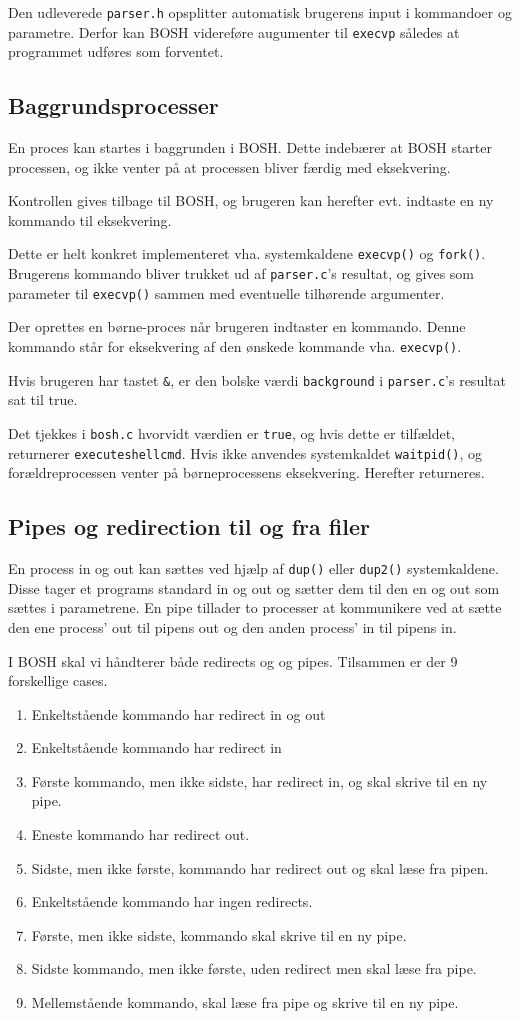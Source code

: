 Den udleverede \verb+parser.h+ opsplitter automatisk brugerens input i kommandoer og parametre. Derfor kan BOSH videreføre augumenter til \verb+execvp+ således at programmet udføres som forventet.
\subsection{Baggrundsprocesser}
En proces kan startes i baggrunden i BOSH. Dette indebærer at BOSH starter processen, og ikke venter på at processen bliver færdig med eksekvering. 

Kontrollen gives tilbage til BOSH, og brugeren kan herefter evt. indtaste en ny kommando til eksekvering. 

Dette er helt konkret implementeret vha. systemkaldene \verb+execvp()+ og \verb+fork()+. Brugerens kommando bliver trukket ud af \verb+parser.c+'s resultat, og gives som parameter til \verb+execvp()+ sammen med eventuelle tilhørende argumenter. 

Der oprettes en børne-proces når brugeren indtaster en kommando. Denne kommando står for eksekvering af den ønskede kommande vha. \verb+execvp()+. 

Hvis brugeren har tastet \verb+&+, er den bolske værdi \verb+background+ i \verb+parser.c+'s resultat sat til true. 

Det tjekkes i \verb+bosh.c+ hvorvidt værdien er \verb+true+, og hvis dette er tilfældet, returnerer \verb+executeshellcmd+. Hvis ikke anvendes systemkaldet \verb+waitpid()+, og forældreprocessen venter på børneprocessens eksekvering. Herefter returneres.
\subsection{Pipes og redirection til og fra filer}
En process in og out kan sættes ved hjælp af \verb+dup()+ eller \verb+dup2()+ systemkaldene. Disse tager et programs standard in og out og sætter dem til den en og out som sættes i parametrene. En pipe tillader to processer at kommunikere ved at sætte den ene process' out til pipens out og den anden process' in til pipens in.

I BOSH skal vi håndterer både redirects og og pipes. Tilsammen er der 9 forskellige cases.
\begin{enumerate}
	\item Enkeltstående kommando har redirect in og out
	\item Enkeltstående kommando har redirect in
	\item Første kommando, men ikke sidste, har redirect in, og skal skrive til en ny pipe.
	\item Eneste kommando har redirect out.
	\item Sidste, men ikke første, kommando har redirect out og skal læse fra pipen.
	\item Enkeltstående kommando har ingen redirects.
	\item Første, men ikke sidste, kommando skal skrive til en ny pipe.
	\item Sidste kommando, men ikke første, uden redirect men skal læse fra pipe.
	\item Mellemstående kommando, skal læse fra pipe og skrive til en ny pipe.
\end{enumerate}

